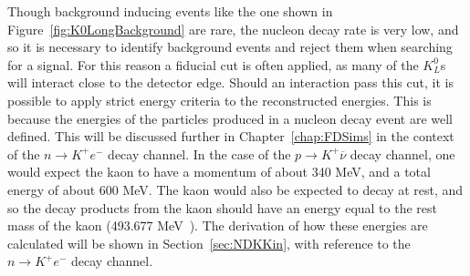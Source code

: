 Though background inducing events like the one shown in Figure~\ref{fig:K0LongBackground} are rare, the nucleon decay rate is very low, and so it is necessary to identify background events and reject them when searching for a signal. For this reason a fiducial cut is often applied, as many of the $K^{0}_{L}$s will interact close to the detector edge. Should an interaction pass this cut, it is possible to apply strict energy criteria to the reconstructed energies. This is because the energies of the particles produced in a nucleon decay event are well defined. This will be discussed further in Chapter~\ref{chap:FDSims} in the context of the $n \rightarrow K^{+} e^{-}$ decay channel. In the case of the $p \rightarrow K^{+} \overline{\nu}$ decay channel, one would expect the kaon to have a momentum of about 340 MeV, and a total energy of about 600 MeV. The kaon would also be expected to decay at rest, and so the decay products from the kaon should have an energy equal to the rest mass of the kaon (493.677 MeV~\citep{PDGReview}). The derivation of how these energies are calculated will be shown in Section~\ref{sec:NDKKin}, with reference to the $n \rightarrow K^{+} e^{-}$ decay channel. \\
